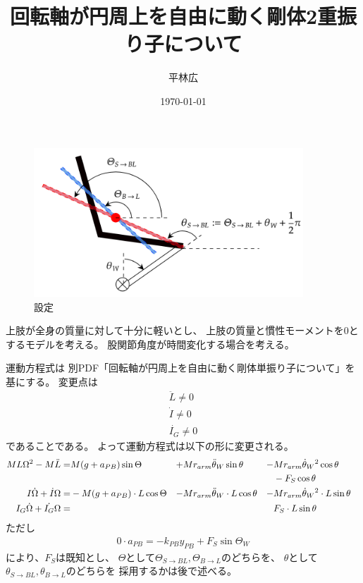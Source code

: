 \documentclass[a4paper,11pt]{jsarticle}
\begin{document}
\title{回転軸が円周上を自由に動く剛体2重振り子について}
\author{平林広}
\date{\today}
\maketitle

\begin{figure}[h]
  \centering
  \includegraphics[width = 0.9\textwidth]{conf.png}
  \caption{設定}
  \label{conf.png}
\end{figure}
上肢が全身の質量に対して十分に軽いとし、
上肢の質量と慣性モーメントを$0$とするモデルを考える。
股関節角度が時間変化する場合を考える。

運動方程式は
別PDF「回転軸が円周上を自由に動く剛体単振り子について」を基にする。
変更点は
\begin{gather*}
  \ddot{L} \neq 0
  \\
  \dot{I} \neq 0
  \\
  \dot{I_G} \neq 0
\end{gather*}
であることである。
よって運動方程式は以下の形に変更される。
\begin{align}
  ML\Omega^2 - M\ddot{L}
  =& M(g+a_{PB})\sin\Theta 
  &+& Mr_{arm}\ddot{\theta}_W\sin\theta 
  &-& Mr_{arm}\dot{\theta}_W{}^2\cos\theta 
  \notag
  \\
  &&&&&- F_S\cos\theta
  \label{eq:PB:L_start}
  \\
  I\dot\Omega + \dot{I}\Omega
  =& -M(g+a_{PB}) \cdot L\cos\Theta
  &-& Mr_{arm}\ddot{\theta}_W \cdot L \cos\theta
  &-& Mr_{arm}\dot{\theta}_W{}^2 \cdot L \sin\theta
  &
  \label{eq:PB:I_start}
  \\
  I_G\dot\Omega + \dot{I_G}\Omega
  =& 
  &&&& F_S \cdot L \sin\theta
  \label{eq:PB:IG_start}
\end{align}
ただし
\begin{gather*}
  0\cdot a_{PB} = -k_{PB}y_{PB} + F_S\sin\Theta_W
\end{gather*}
により、$F_S$は既知とし、
$\Theta$として$\Theta_{S\rightarrow BL}, \Theta_{B\rightarrow L}$のどちらを、
$\theta$として$\theta_{S\rightarrow BL}, \theta_{B\rightarrow L}$のどちらを
採用するかは後で述べる。
\end{document}
